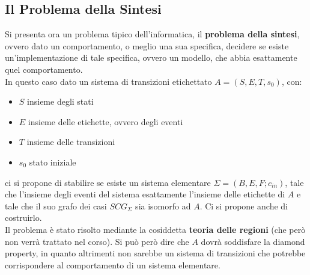 \documentclass[a4paper,12pt, oneside]{book}
\begin{document}
\subsection{Il Problema della Sintesi}
Si presenta ora un problema tipico dell'informatica, il \textbf{problema della
  sintesi}, ovvero dato un comportamento, o meglio una sua specifica, decidere
se esiste un'implementazione di tale specifica, ovvero un modello, che abbia
esattamente quel comportamento.\\
In questo caso dato un sistema di transizioni etichettato $A=(S,E,T,s_0)$, con:
\begin{itemize}
  \item $S$ insieme degli stati
  \item $E$ insieme delle etichette, ovvero degli eventi
  \item $T$ insieme delle transizioni
  \item $s_0$ stato iniziale
\end{itemize}
ci si propone di stabilire se esiste un sistema elementare
$\Sigma=(B,E,F;c_{in})$, tale che l'insieme degli eventi del sistema esattamente
l'insieme delle etichette di $A$ e tale che il suo grafo dei casi $SCG_\Sigma$
sia isomorfo ad $A$. Ci si propone anche di costruirlo.\\
Il problema è stato risolto mediante la cosiddetta \textbf{teoria delle regioni}
(che però non verrà trattato nel corso). Si può però dire che $A$ dovrà
soddisfare la diamond property, in quanto altrimenti non sarebbe un sistema di
transizioni che potrebbe corrispondere al comportamento di un sistema
elementare.
\end{document}
